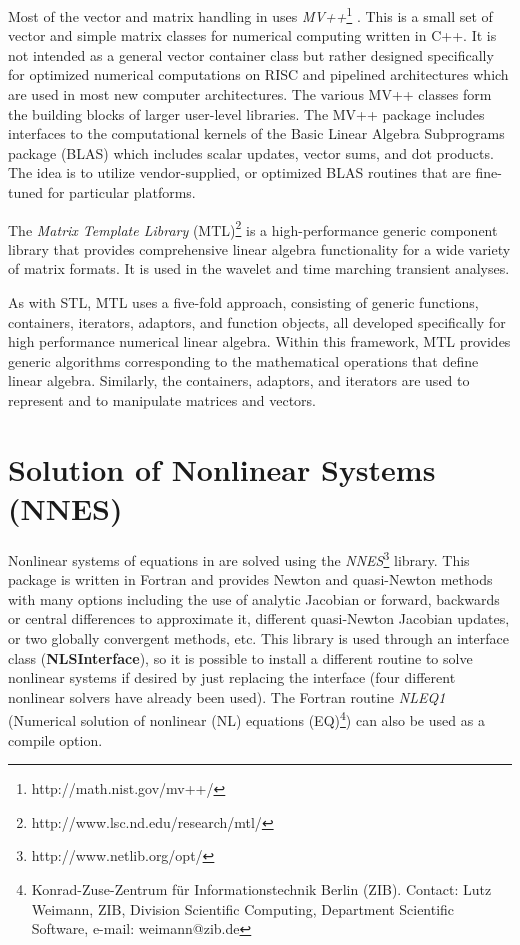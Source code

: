 Most of the vector and matrix handling in \FDA uses
\emph{MV++}\footnote{http://math.nist.gov/mv++/} \cite{mv++}. This
is a small set of vector and simple matrix classes for numerical
computing written in C++. It is not intended as a general vector
container class but rather designed specifically for optimized
numerical computations on RISC and pipelined architectures which
are used in most new computer architectures. The various MV++
classes form the building blocks of larger user-level libraries.
The MV++ package includes interfaces to the computational kernels
of the Basic Linear Algebra Subprograms package (BLAS) which
includes scalar updates, vector sums, and dot products. The idea
is to utilize vendor-supplied, or optimized BLAS routines that are
fine-tuned for particular platforms.

The \emph{Matrix Template Library}
(MTL)\footnote{http://www.lsc.nd.edu/research/mtl/} is a
high-performance generic component library that provides
comprehensive linear algebra functionality for a wide variety of
matrix formats. It is used in the wavelet and time marching
transient analyses.

As with STL, MTL uses a five-fold approach, consisting of generic
functions, containers, iterators, adaptors, and function objects,
all developed specifically for high performance numerical linear
algebra. Within this framework, MTL provides generic algorithms
corresponding to the mathematical operations that define linear
algebra. Similarly, the containers, adaptors, and iterators are
used to represent and to manipulate matrices and vectors.

\section{Solution of Nonlinear Systems (NNES)}

Nonlinear systems of equations in \FDA are solved using the
\emph{NNES}\footnote{http://www.netlib.org/opt/} \cite{NNES}
library. This package is written in Fortran and provides Newton
and quasi-Newton methods with many options including the use of
analytic Jacobian or forward, backwards or central differences to
approximate it, different quasi-Newton Jacobian updates, or two
globally convergent methods, etc.  This library is used through an
interface class ({\bf NLSInterface}), so it is possible to install
a different routine to solve nonlinear systems if desired by just
replacing the interface (four different nonlinear solvers have
already been used). The Fortran routine \emph{NLEQ1} (Numerical
solution of nonlinear (NL) equations
(EQ)\footnote{Konrad-Zuse-Zentrum f\"ur Informationstechnik Berlin
(ZIB). Contact: Lutz Weimann, ZIB, Division Scientific Computing,
Department Scientific Software, e-mail: weimann@zib.de}) can also
be used as a compile option.

